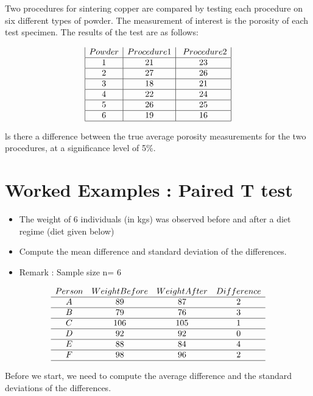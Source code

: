 Two procedures for sintering copper are compared by testing each procedure on six different types of powder. The measurement of interest is the porosity of each test specimen.
The results of the test are as follows:  

\[
\begin{array}{|c|c|c|}
Powder&Procedure 1& Procedure 2\\\hline
1&21&23\\\hline
2&27&26\\\hline
3&18&21\\\hline
4&22&24\\\hline
5&26&25\\\hline
6&19&16\\\hline
\end{array} 
\]




ls there a difference between the true average porosity measurements for the two procedures, at a significance level of 5\%.





\section{Worked Examples : Paired T test}
\begin{itemize}
\item The weight of 6 individuals (in kgs) was observed before and after a diet regime (diet given below)
\item Compute the mean difference and standard deviation of the differences.

\item Remark : Sample size n= 6
\end{itemize}

\[
\begin{array}{cccc}
Person&Weight Before&Weight After&Difference\\ \hline
A&89&87&2\\ \hline
B&79&76&3\\ \hline
C&106&105&1\\ \hline
D&92&92&0\\ \hline
E&88&84&4\\ \hline
F&98&96&2\\ \hline
\end{array} 
\]

Before we start, we need to compute the average difference and the standard deviations of the differences. 




